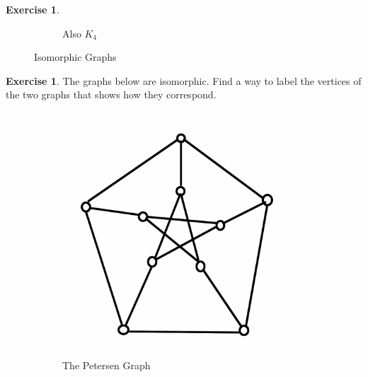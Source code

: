 \documentclass[12pt,letterpaper]{article}
\theoremstyle{definition}
\newtheorem{exercise}[question]{Exercise}
\begin{document}
\begin{exercise}
\begin{figure}[h]
\begin{subfigure}[b]{0.4\textwidth}
\caption{Also $K_4$}
\end{subfigure}
\caption{Isomorphic Graphs}
\label{fig:k4}
\end{figure}
\end{exercise}

\begin{exercise}
The graphs below are isomorphic. Find a way to label the vertices of the two graphs that shows how they correspond.
\begin{figure}[h]
\centering
\begin{subfigure}[b]{0.4\textwidth}
\includegraphics[width=\textwidth]{images/petersen-std.png}
\caption{The Petersen Graph}
\end{subfigure}
\qquad
\begin{subfigure}[b]{0.4\textwidth}

\end{subfigure}
\end{figure}
\end{exercise}
\end{document}
